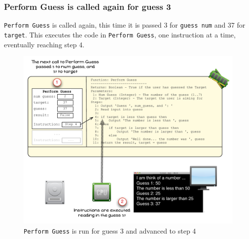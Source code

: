 
\clearpage

\subsubsection{Perform Guess is called again for guess 3} %
\label{ssub:perform_guess_is_called_again_for_guess_3}

\texttt{Perform Guess} is called again, this time it is passed 3 for \texttt{guess num} and 37 for \texttt{target}. This executes the code in \texttt{Perform Guess}, one instruction at a time, eventually reaching step 4.

\begin{figure}[htbp]
   \centering
   \includegraphics[width=\textwidth]{./topics/control-flow/images/PerformGuess9} 
   \caption{\texttt{Perform Guess} is run for guess 3 and advanced to step 4}
   \label{fig:perform-guess-9}
\end{figure}

